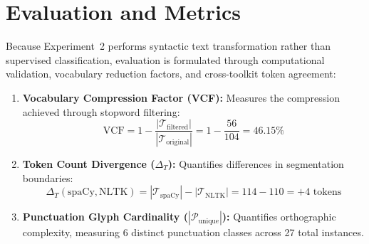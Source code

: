 \section{Evaluation and Metrics}
Because Experiment~2 performs syntactic text transformation rather than supervised classification, evaluation is formulated through computational validation, vocabulary reduction factors, and cross-toolkit token agreement:
\begin{enumerate}
    \item \textbf{Vocabulary Compression Factor (VCF):} Measures the compression achieved through stopword filtering:
    \begin{equation}
        \text{VCF} = 1 - \frac{|\mathcal{T}_{\text{filtered}}|}{|\mathcal{T}_{\text{original}}|} = 1 - \frac{56}{104} = 46.15\%
    \end{equation}
    \item \textbf{Token Count Divergence ($\Delta_T$):} Quantifies differences in segmentation boundaries:
    \begin{equation}
        \Delta_T(\text{spaCy}, \text{NLTK}) = |\mathcal{T}_{\text{spaCy}}| - |\mathcal{T}_{\text{NLTK}}| = 114 - 110 = +4 \text{ tokens}
    \end{equation}
    \item \textbf{Punctuation Glyph Cardinality ($|\mathcal{P}_{\text{unique}}|$):} Quantifies orthographic complexity, measuring 6 distinct punctuation classes across 27 total instances.
\end{enumerate}

